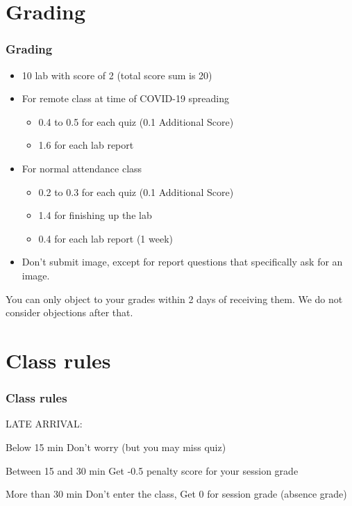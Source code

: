 \documentclass[aspectratio=169,15pt]{beamer}
\begin{document}
\section{Grading}
\begin{frame}
    \frametitle{Grading}

    \begin{itemize}
        \item 10 lab with score of \alert{2} (total score sum is \alert{20})
        \item For remote class at time of \alert{COVID-19} spreading
        \begin{itemize}
            \item {\color{red} 0.4} to {\color{red} 0.5} for each quiz (0.1 Additional Score)
            \item {\color{red} 1.6} for each lab report
        \end{itemize}
        \item For normal attendance class
        \begin{itemize}
            \item {\color{red} 0.2} to {\color{red} 0.3} for each quiz (0.1 Additional Score)
            \item {\color{red} 1.4} for finishing up the lab
            \item {\color{red} 0.4} for each lab report (1 week)
        \end{itemize}
        \item Don’t submit image, except for report questions that specifically ask for an image.
    \end{itemize}
    \begin{alertblock}{}
        You can only object to your grades within {\color{red} 2 days} of receiving them.
        We do not consider objections after that.
    \end{alertblock}

\end{frame}

\section{Class rules}
\begin{frame}
    \frametitle{Class rules}

    LATE ARRIVAL:
    {
        \begin{block}{Below 15 min} Don’t worry (but you may miss quiz) \end{block}
    }
    {
        \begin{block}{Between 15 and 30 min} Get \alert{-0.5} penalty score for your session grade \end{block}
    }
    \begin{alertblock}{More than 30 min} Don’t enter the class, Get \alert{0} for session grade (absence grade) \end{alertblock}

\end{frame}
\end{document}
